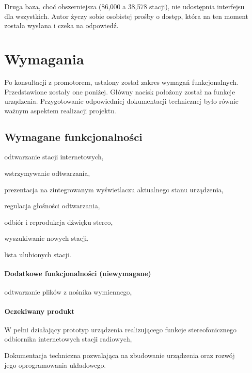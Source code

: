 \documentclass[polish]{aghengthesis}
\let\tempone\itemize
\let\temptwo\enditemize
\renewenvironment{itemize}{\tempone\setlength{\itemsep}{0cm}}{\temptwo}
\begin{document}
		Druga baza, choć obszerniejsza (86,000 a 38,578 stacji), nie udostępnia interfejsu dla wszystkich. Autor życzy sobie osobistej prośby o dostęp, która na ten moment została wysłana i czeka na odpowiedź.
		
	\section{Wymagania}
		Po konsultacji z promotorem, ustalony został zakres wymagań funkcjonalnych. Przedstawione zostały one poniżej. Główny nacisk położony został na funkcje urządzenia.
		Przygotowanie odpowiedniej dokumentacji technicznej było równie ważnym aspektem realizacji projektu.
	
		
		\subsection{Wymagane funkcjonalności}
			\begin{itemize}
				\item odtwarzanie stacji internetowych,
				\item wstrzymywanie odtwarzania,
				\item prezentacja na zintegrowanym wyświetlaczu aktualnego stanu urządzenia,
				\item regulacja głośności odtwarzania,
				\item odbiór i reprodukcja dźwięku stereo,
				\item wyszukiwanie nowych stacji,
				\item lista ulubionych stacji.
			\end{itemize}
			
			\paragraph{Dodatkowe funkcjonalności (niewymagane)}
			\begin{itemize}
				\item odtwarzanie plików z nośnika wymiennego,
			\end{itemize}
		
			\paragraph{Oczekiwany produkt}
			\begin{itemize}
				\item W pełni działający prototyp urządzenia realizującego funkcje stereofonicznego odbiornika internetowych stacji radiowych,
				\item Dokumentacja techniczna pozwalająca na zbudowanie urządzenia oraz rozwój jego oprogramowania układowego.
			\end{itemize}
		
\end{document}
